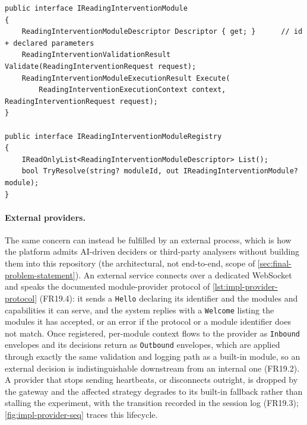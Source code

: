 \begin{listing}[htbp]
\begin{verbatim}
public interface IReadingInterventionModule
{
    ReadingInterventionModuleDescriptor Descriptor { get; }      // id + declared parameters
    ReadingInterventionValidationResult Validate(ReadingInterventionRequest request);
    ReadingInterventionModuleExecutionResult Execute(
        ReadingInterventionExecutionContext context, ReadingInterventionRequest request);
}

public interface IReadingInterventionModuleRegistry
{
    IReadOnlyList<ReadingInterventionModuleDescriptor> List();
    bool TryResolve(string? moduleId, out IReadingInterventionModule? module);
}
\end{verbatim}
\caption{In-process module contract (from \texttt{Interventions/}): descriptor, validation, and execution; the registry resolves modules by identifier without naming concrete types.}
\label{lst:impl-module-contract}
\end{listing}

\paragraph{External providers.}
The same concern can instead be fulfilled by an external process, which is how the platform admits AI-driven deciders or third-party analysers without building them into this repository (the architectural, not end-to-end, scope of \cref{sec:final-problem-statement}).
An external service connects over a dedicated WebSocket and speaks the documented module-provider protocol of \cref{lst:impl-provider-protocol} (FR19.4): it sends a \texttt{Hello} declaring its identifier and the modules and capabilities it can serve, and the system replies with a \texttt{Welcome} listing the modules it has accepted, or an error if the protocol or a module identifier does not match.
Once registered, per-module context flows to the provider as \texttt{Inbound} envelopes and its decisions return as \texttt{Outbound} envelopes, which are applied through exactly the same validation and logging path as a built-in module, so an external decision is indistinguishable downstream from an internal one (FR19.2).
A provider that stops sending heartbeats, or disconnects outright, is dropped by the gateway and the affected strategy degrades to its built-in fallback rather than stalling the experiment, with the transition recorded in the session log (FR19.3); \cref{fig:impl-provider-seq} traces this lifecycle.


